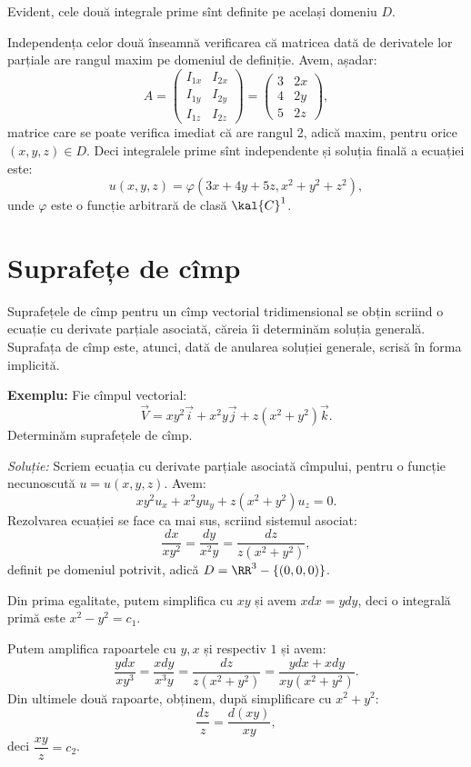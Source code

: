 Evident, cele două integrale prime sînt definite pe același domeniu $ D $.

Independența celor două înseamnă verificarea că matricea dată de derivatele
lor par\-ți\-a\-le are rangul maxim pe domeniul de definiție. Avem, așadar:
\[
  A = \begin{pmatrix}
    I_{1x} & I_{2x} \\
    I_{1y} & I_{2y} \\
    I_{1z} & I_{2z}
  \end{pmatrix} = \begin{pmatrix}
    3 & 2x \\
    4 & 2y \\
    5 & 2z
  \end{pmatrix},
\]
matrice care se poate verifica imediat că are rangul 2, adică maxim, pentru orice
$(x,y,z) \in D $. Deci integralele prime sînt independente și soluția finală a
ecuației este:
\[
  u(x, y, z) = \varphi(3x + 4y + 5z, x^2 + y^2 + z^2),
\]
unde $ \varphi $ este o funcție arbitrară de clasă $ \kal{C}^1 $.


\section{Suprafețe de cîmp}

\indent\indent Suprafețele de cîmp pentru un cîmp vectorial tridimensional
se obțin scriind o ecuație cu derivate parțiale asociată, căreia îi determinăm
soluția generală. Suprafața de cîmp este, atunci, dată de anularea soluției
generale, scrisă în forma implicită.

\textbf{Exemplu:} Fie cîmpul vectorial:
\[
  \vec{V} = xy^2 \vec{i} + x^2y \vec{j} + z(x^2 + y^2) \vec{k}.
\]
Determinăm suprafețele de cîmp.

\emph{Soluție:} Scriem ecuația cu derivate parțiale asociată cîmpului,
pentru o funcție necunoscută $ u = u(x, y, z) $. Avem:
\[
  xy^2 u_x + x^2y u_y + z(x^2 + y^2)u_z = 0. 
\]
Rezolvarea ecuației se face ca mai sus, scriind sistemul asociat:
\[
  \dfrac{dx}{xy^2} = \dfrac{dy}{x^2y} = \dfrac{dz}{z(x^2 + y^2)},
\]
definit pe domeniul potrivit, adică $ D = \RR^3 - \{(0, 0, 0)\}$.

Din prima egalitate, putem simplifica cu $ xy $ și avem $ xdx = ydy $, deci
o integrală primă este $ x^2 - y^2 = c_1 $.

Putem amplifica rapoartele cu $ y, x $ și respectiv $ 1 $ și avem:
\[
  \dfrac{ydx}{xy^3} = \dfrac{xdy}{x^3y} = \dfrac{dz}{z(x^2 + y^2)} = %
  \dfrac{ydx + xdy}{xy(x^2 + y^2)}.
\]
Din ultimele două rapoarte, obținem, după simplificare cu $ x^2 + y^2 $:
\[
  \dfrac{dz}{z} = \dfrac{d(xy)}{xy},
\]
deci $ \dfrac{xy}{z} = c_2 $.

